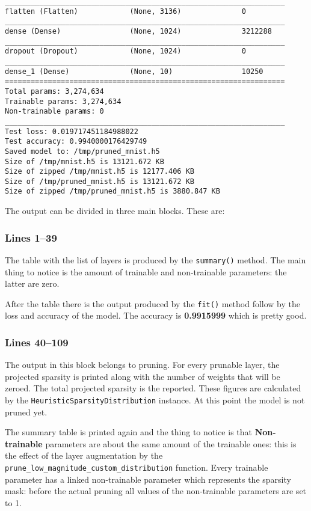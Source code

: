 \begin{lstlisting}[label={lst:mnistpipelineoutput},
    caption=MNIST pipeline output execution]
_________________________________________________________________
flatten (Flatten)            (None, 3136)              0
_________________________________________________________________
dense (Dense)                (None, 1024)              3212288
_________________________________________________________________
dropout (Dropout)            (None, 1024)              0
_________________________________________________________________
dense_1 (Dense)              (None, 10)                10250
=================================================================
Total params: 3,274,634
Trainable params: 3,274,634
Non-trainable params: 0
_________________________________________________________________
Test loss: 0.019717451184988022
Test accuracy: 0.9940000176429749
Saved model to: /tmp/pruned_mnist.h5
Size of /tmp/mnist.h5 is 13121.672 KB
Size of zipped /tmp/mnist.h5 is 12177.406 KB
Size of /tmp/pruned_mnist.h5 is 13121.672 KB
Size of zipped /tmp/pruned_mnist.h5 is 3880.847 KB
\end{lstlisting}

The output can be divided in three main blocks. These are:

\subsubsection{Lines 1--39}
The table with the list of layers is produced by the
\texttt{summary\string(\string)} method. The main thing to notice is the amount
of trainable and non-trainable parameters: the latter are zero.

After the table there is the output produced by the
\texttt{fit\string(\string)} method follow by the loss and accuracy of the
model. The accuracy is \textbf{0.9915999} which is pretty good.

\subsubsection{Lines 40--109}
The output in this block belongs to pruning. For every prunable layer, the
projected sparsity is printed along with the number of weights that will be
zeroed. The total projected sparsity is the reported. These figures are
calculated by the \texttt{HeuristicSparsityDistribution} instance. At this
point the model is not pruned yet.

The summary table is printed again and the thing to notice is that
\textbf{Non-trainable} parameters are about the same amount of the trainable
ones: this is the effect of the layer augmentation by the \linebreak
\texttt{prune\_low\_magnitude\_custom\_distribution} function.
Every trainable parameter has a linked non-trainable parameter which represents
the sparsity mask: before the actual pruning all values of the non-trainable
parameters are set to 1.

